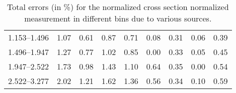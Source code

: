 \begin{table}
\begin{center}
\begin{tabular}{@{}l l l l l l l l l@{}}
            1.153--1.496    &  1.07   &  0.61   &  0.87         &  0.71      &  0.08    &  0.31  &  0.06       &  0.39  \\
            1.496--1.947    &  1.27   &  0.77   &  1.02         &  0.85      &  0.00    &  0.33  &  0.05       &  0.45  \\
            1.947--2.522    &  1.73   &  0.98   &  1.43         &  1.10      &  0.64    &  0.35  &  0.00       &  0.54  \\
            2.522--3.277    &  2.02   &  1.21   &  1.62         &  1.36      &  0.56    &  0.34  &  0.10       &  0.59  \\
            \bottomrule
        \end{tabular}
    \end{center}
    \caption[
        Total errors (in \%) for the normalized cross section normalized
        measurement.
    ]{
        Total errors (in \%) for the normalized cross section normalized
        measurement in different \phistar bins due to various sources.
    }
    \label{tab:sys_uncert_norm}
\end{table}
